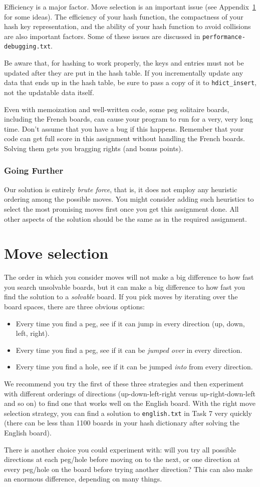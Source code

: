 \documentclass[12pt]{exam}
\begin{document}
Efficiency is a major factor.  Move selection is an important issue
(see Appendix~\ref{app:movesel} for some ideas).  The efficiency of
your hash function, the compactness of your hash key representation,
and the ability of your hash function to avoid collisions are also
important factors. Some of these issues are discussed in
\lstinline'performance-debugging.txt'.

Be aware that, for hashing to work properly, the keys and entries must
not be updated after they are put in the hash table. If you
incrementally update any data that ends up in the hash table, be sure
to pass a copy of it to \lstinline'hdict_insert', not the updatable
data itself.

Even with memoization and well-written code, some peg solitaire
boards, including the French boards, can cause your program to run for
a very, very long time. Don't assume that you have a bug if this
happens.  Remember that your code can get full score in this
assignment without handling the French boards.  Solving them gets you
bragging rights (and bonus points).


\subsubsection*{Going Further}

Our solution is entirely \emph{brute force}, that is, it does not
employ any heuristic ordering among the possible moves.  You might
consider adding such heuristics to select the most promising moves
first once you get this assignment done. All other aspects of the
solution should be the same as in the required assignment.


\appendix
\section{Move selection}
\label{app:movesel}

The order in which you consider moves will not make a big difference
to how fast you search unsolvable boards, but it can make a big
difference to how fast you find the solution to a \emph{solvable}
board. If you pick moves by iterating over the board spaces, there are
three obvious options:
\begin{itemize}
\item Every time you find a
  peg, see if it can jump in every direction (up, down, left, right).
\item Every time you find a
  peg, see if it can be \emph{jumped over} in every direction.
\item Every time you find a
  hole, see if it can be jumped \emph{into} from every direction.
\end{itemize}
We recommend you try the first of these three strategies and then
experiment with different orderings of directions (up-down-left-right
versus up-right-down-left and so on) to find one that works well on
the English board. With the right move selection strategy, you can
find a solution to \lstinline'english.txt' in Task 7 very quickly
(there can be less than 1100 boards in your hash dictionary after
solving the English board).

There is another choice you could experiment with: will you try all
possible directions at each peg/hole before moving on to the next, or
one direction at every peg/hole on the board before trying another
direction? This can also make an enormous difference, depending on
many things.
\end{document}

